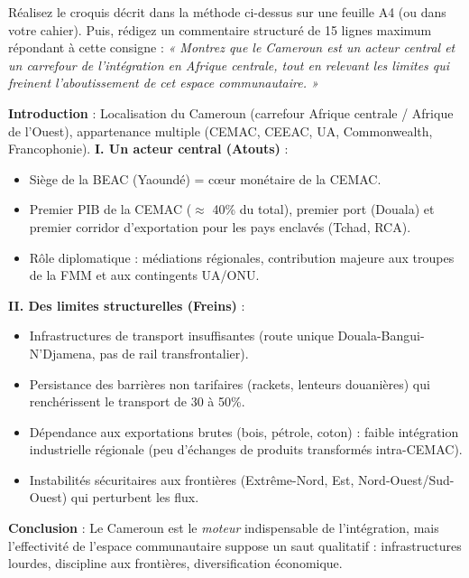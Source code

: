 \documentclass[11pt]{article}
\begin{document}
\begin{exercice}
Réalisez le croquis décrit dans la méthode ci-dessus sur une feuille A4 (ou dans votre cahier). Puis, rédigez un commentaire structuré de 15 lignes maximum répondant à cette consigne : \emph{« Montrez que le Cameroun est un acteur central et un carrefour de l'intégration en Afrique centrale, tout en relevant les limites qui freinent l'aboutissement de cet espace communautaire. »}
\end{exercice}

\begin{corrige}
\textbf{Introduction} : Localisation du Cameroun (carrefour Afrique centrale / Afrique de l'Ouest), appartenance multiple (CEMAC, CEEAC, UA, Commonwealth, Francophonie).
\textbf{I. Un acteur central (Atouts)} :
\begin{itemize}
\item Siège de la BEAC (Yaoundé) = cœur monétaire de la CEMAC.
\item Premier PIB de la CEMAC ($\approx$ 40\% du total), premier port (Douala) et premier corridor d'exportation pour les pays enclavés (Tchad, RCA).
\item Rôle diplomatique : médiations régionales, contribution majeure aux troupes de la FMM et aux contingents UA/ONU.
\end{itemize}
\textbf{II. Des limites structurelles (Freins)} :
\begin{itemize}
\item Infrastructures de transport insuffisantes (route unique Douala-Bangui-N'Djamena, pas de rail transfrontalier).
\item Persistance des barrières non tarifaires (rackets, lenteurs douanières) qui renchérissent le transport de 30 à 50\%.
\item Dépendance aux exportations brutes (bois, pétrole, coton) : faible intégration industrielle régionale (peu d'échanges de produits transformés intra-CEMAC).
\item Instabilités sécuritaires aux frontières (Extrême-Nord, Est, Nord-Ouest/Sud-Ouest) qui perturbent les flux.
\end{itemize}
\textbf{Conclusion} : Le Cameroun est le \emph{moteur} indispensable de l'intégration, mais l'effectivité de l'espace communautaire suppose un saut qualitatif : infrastructures lourdes, discipline aux frontières, diversification économique.
\end{corrige}
\end{document}
